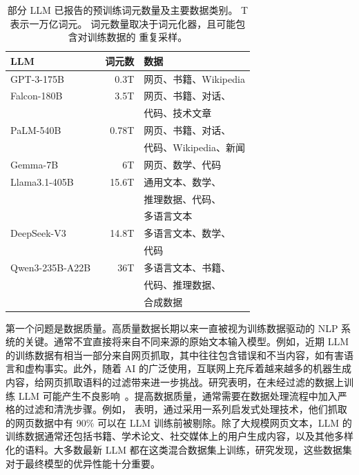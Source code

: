 \begin{table}[t]
\centering
\begingroup
\renewcommand{\arraystretch}{1.2}
\begin{tabular}{l | r | l}
LLM & 词元数 & 数据 \\ \hline
GPT-3-175B~\cite{brown-etal:2020language}
& 0.3T & 网页、书籍、Wikipedia \\ \hline
Falcon-180B~\cite{almazrouei-etal:2023falcon}
& 3.5T & 网页、书籍、对话、 \\
& & 代码、技术文章 \\ \hline
PaLM-540B~\cite{chowdhery-etal:2022palm}
& 0.78T & 网页、书籍、对话、 \\
& & 代码、Wikipedia、新闻 \\ \hline
Gemma-7B~\cite{gemma:24}
& 6T & 网页、数学、代码 \\ \hline
Llama3.1-405B~\cite{dubey2024llama}
& 15.6T & 通用文本、数学、 \\
& & 推理数据、代码、 \\
&  & 多语言文本 \\ \hline
DeepSeek-V3~\cite{liu2024deepseek}
& 14.8T & 多语言文本、数学、\\
 & &  代码 \\ \hline
Qwen3-235B-A22B~\cite{qwen:2025qwen3}
& 36T & 多语言文本、书籍、 \\
& & 代码、推理数据、  \\
& & 合成数据
\end{tabular}
\endgroup
\caption{部分 LLM 已报告的预训练词元数量及主要数据类别。
T 表示一万亿词元。
词元数量取决于词元化器，且可能包含对训练数据的
重复采样。}
\label{tab:training-data-size-llm}
\end{table}

第一个问题是数据质量。高质量数据长期以来一直被视为训练数据驱动的 NLP 系统的关键。通常不宜直接将来自不同来源的原始文本输入模型。例如，近期 LLM 的训练数据有相当一部分来自网页抓取，其中往往包含错误和不当内容，如有害语言和虚构事实。此外，随着 AI 的广泛使用，互联网上充斥着越来越多的机器生成内容，给网页抓取语料的过滤带来进一步挑战。研究表明，在未经过滤的数据上训练 LLM 可能产生不良影响~\cite{raffel-etal:2020exploring}。提高数据质量，通常需要在数据处理流程中加入严格的过滤和清洗步骤。例如，\citet{penedo-etal:2023refinedweb} 表明，通过采用一系列启发式处理技术，他们抓取的网页数据中有 90\% 可以在 LLM 训练前被剔除。除了大规模网页文本，LLM 的训练数据通常还包括书籍、学术论文、社交媒体上的用户生成内容，以及其他多样化的语料。大多数最新 LLM 都在这类混合数据集上训练，研究发现，这些数据集对于最终模型的优异性能十分重要。

